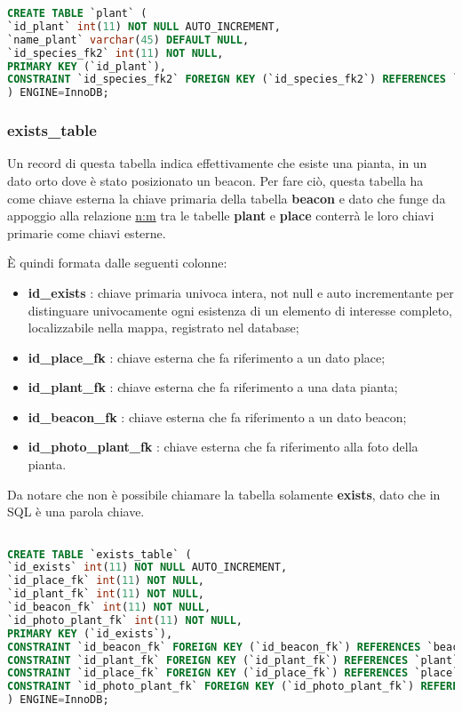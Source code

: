 \begin{lstlisting}[language=SQL, caption=Codice SQL della Tabella Plant]
CREATE TABLE `plant` (
`id_plant` int(11) NOT NULL AUTO_INCREMENT,
`name_plant` varchar(45) DEFAULT NULL,
`id_species_fk2` int(11) NOT NULL,
PRIMARY KEY (`id_plant`),
CONSTRAINT `id_species_fk2` FOREIGN KEY (`id_species_fk2`) REFERENCES `species` (`id_species`) ON UPDATE CASCADE 
) ENGINE=InnoDB; 
\end{lstlisting}

\subsubsection{exists\_table}
Un record di questa tabella indica effettivamente che esiste una pianta, in un dato orto dove è stato posizionato un beacon. \newline
Per fare ciò, questa tabella ha come chiave esterna la chiave primaria della tabella \textbf{beacon} e dato che funge da appoggio alla relazione \underline{n:m} tra le tabelle \textbf{plant} e \textbf{place} conterrà le loro chiavi primarie come chiavi esterne. \newline

È quindi formata dalle seguenti colonne:

\begin{itemize}
\item \textbf{id\_exists} : chiave primaria univoca intera, not null e auto incrementante per distinguare univocamente ogni esistenza di un elemento di interesse completo, localizzabile nella mappa, registrato nel database;
\item \textbf{id\_place\_fk} : chiave esterna che fa riferimento a un dato place;
\item \textbf{id\_plant\_fk} : chiave esterna che fa riferimento a una data pianta;
\item \textbf{id\_beacon\_fk} : chiave esterna che fa riferimento a un dato beacon;
\item \textbf{id\_photo\_plant\_fk} : chiave esterna che fa riferimento alla foto della pianta.

\end{itemize}
Da notare che non è possibile chiamare la tabella solamente \textbf{exists}, dato che in SQL è una parola chiave.
\begin{lstlisting}[language=SQL, caption=Codice SQL della Tabella exists\_table]

CREATE TABLE `exists_table` (
`id_exists` int(11) NOT NULL AUTO_INCREMENT,
`id_place_fk` int(11) NOT NULL,
`id_plant_fk` int(11) NOT NULL,
`id_beacon_fk` int(11) NOT NULL,
`id_photo_plant_fk` int(11) NOT NULL,
PRIMARY KEY (`id_exists`),
CONSTRAINT `id_beacon_fk` FOREIGN KEY (`id_beacon_fk`) REFERENCES `beacon` (`id_beacon`) ON UPDATE CASCADE,
CONSTRAINT `id_plant_fk` FOREIGN KEY (`id_plant_fk`) REFERENCES `plant` (`id_plant`) ON UPDATE CASCADE,
CONSTRAINT `id_place_fk` FOREIGN KEY (`id_place_fk`) REFERENCES `place` (`id_place`) ON UPDATE CASCADE,
CONSTRAINT `id_photo_plant_fk` FOREIGN KEY (`id_photo_plant_fk`) REFERENCES `photo` (`id_photo`) ON UPDATE CASCADE
) ENGINE=InnoDB; 

\end{lstlisting}

